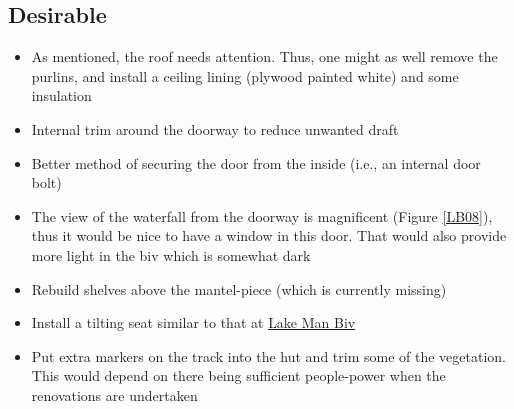 \documentclass[12pt]{article} %
\begin{document}
\subsection{Desirable}

\begin{itemize}
 \item As mentioned, the roof needs attention.  Thus, one might as well remove the purlins, and install a ceiling lining (plywood painted white) and some insulation
 \item Internal trim around the doorway to reduce unwanted draft
 \item Better method of securing the door from the inside (i.e., an internal door bolt)
 \item The view of the waterfall from the doorway is magnificent (Figure \ref{LB08}), thus it would be nice to have a window in this door.  That would also provide more light in the biv which is somewhat dark
  \item Rebuild shelves above the mantel-piece (which is currently missing)
  \item Install a tilting seat similar to that at \href{https://drive.google.com/open?id=1DdW8LlDO5h38anP1OH9vCVlA9F1gLeeN}{Lake Man Biv}
  \item Put extra markers on the track into the hut and trim some of the vegetation.  This would depend on there being sufficient people-power when the renovations are undertaken

\end{itemize}
\end{document}
